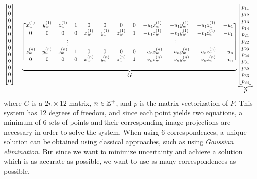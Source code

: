 \setcounter{MaxMatrixCols}{20}
\begin{equation}
    \scalemath{0.9}{
    \begin{bmatrix}
        0 \\ 0 \\ 0 \\ 0 \\ 0 \\ 0 \\ 0 \\ 0 \\ 0 \\ 0 \\ 0 \\ 0
    \end{bmatrix}
    =
    \underbrace{
        \begin{blockarray}{[*{12}c]}
            x_w^{(1)} & y_w^{(1)} & z_w^{(1)} & 1 & 0         & 0         & 0         & 0 & -u_1 x_w^{(1)} & -u_1 y_w^{(1)} & -u_1 z_w^{(1)} & -u_1 \\
            0         & 0         & 0         & 0 & x_w^{(1)} & y_w^{(1)} & z_w^{(1)} & 1 & -v_1 x_w^{(1)} & -v_1 y_w^{(1)} & -v_1 z_w^{(1)} & -v_1 \\
            \BAmulticolumn{6}{c}{\vdots} & \BAmulticolumn{6}{c}{\vdots} \\
            x_w^{(n)} & y_w^{(n)} & z_w^{(n)} & 1 & 0         & 0         & 0         & 0 & -u_n x_w^{(n)} & -u_n y_w^{(n)} & -u_n z_w^{(n)} & -u_n \\
            0         & 0         & 0         & 0 & x_w^{(n)} & y_w^{(n)} & z_w^{(n)} & 1 & -v_n x_w^{(n)} & -v_n y_w^{(n)} & -v_n z_w^{(n)} & -v_n
        \end{blockarray}
    }_{\mathlarger{G}}
    \underbrace{
        \begin{bmatrix}
            p_{11} \\ p_{12} \\ p_{13} \\ p_{14} \\ p_{21} \\ p_{22} \\ p_{23} \\ p_{24} \\ p_{31} \\ p_{32} \\ p_{33} \\ p_{34}
        \end{bmatrix}
    }_{\mathlarger{p}}
    }
\end{equation}
where $G$ is a $2n \times 12$ matrix, $n \in \mathbb{Z}^+$, and $p$ is the matrix vectorization of $P$. This system has 12 degrees of freedom, and since each point yields two equations, a minimum of 6 sets of points and their corresponding image projections are necessary in order to solve the system. When using 6 correspondences, a unique solution can be obtained using classical approaches, such as using 
\emph{Gaussian elimination}. But since we want to minimize uncertainty and achieve a solution which is as accurate as possible, we want to use as many correspondences as possible. 

